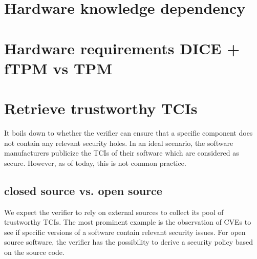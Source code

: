 
\section{Hardware knowledge dependency}



\section{Hardware requirements DICE + fTPM vs TPM}


\section{Retrieve trustworthy TCIs}

It boils down to whether the verifier can ensure that a specific component does not contain any relevant security holes.
In an ideal scenario, the software manufacturers publicize the TCIs of their software which are considered as secure.
However, as of today, this is not common practice.

\subsection{closed source vs. open source}

We expect the verifier to rely on external sources to collect its pool of trustworthy TCIs.
The most prominent example is the observation of CVEs to see if specific versions of a software contain relevant security issues.
For open source software, the verifier has the possibility to derive a security policy based on the source code.

